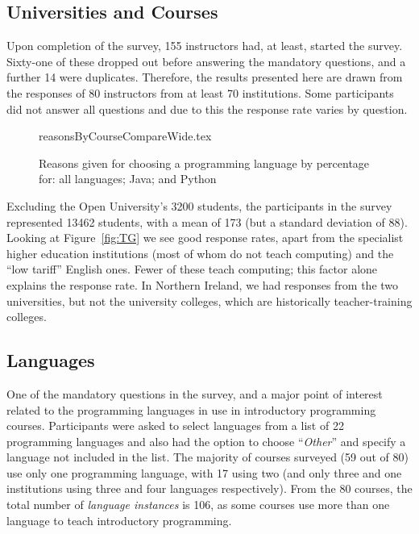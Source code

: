 \documentclass[english,submission]{programming}
\begin{document}
\subsection{Universities and Courses}

Upon completion of the survey, 155 instructors had, at least, started
the survey. Sixty-one of these dropped out before answering the
mandatory questions, and a further 14 were duplicates. Therefore, the
results presented here are drawn from the responses of 80 instructors
from at least 70 institutions. Some participants did not answer all
questions and due to this the response rate varies by question.

\begin{figure}
\begin{center}
{reasonsByCourseCompareWide.tex}
\end{center}
\caption{Reasons given for choosing a programming language by percentage for: all languages; Java; and Python\label{fig:reasons}}
\end{figure}

Excluding the Open University's 3200 students, the participants in the
survey represented 13462 students, with a mean of 173 (but a standard
deviation of 88). Looking at Figure~\ref{fig:TG} we see good response
rates, apart from the specialist higher education institutions (most
of whom do not teach computing) and the ``low tariff'' English
ones. Fewer of these teach computing; this factor alone explains the
response rate. In Northern Ireland, we had responses from the two
universities, but not the university colleges, which are historically
teacher-training colleges.


\subsection{Languages}\label{langs}


One of the mandatory questions in the survey, and a major point of
interest related to the programming languages in use in introductory
programming courses. Participants were asked to select languages from
a list of 22 programming languages and also had the option to choose
``{\emph{Other}}'' and specify a language not included in the list. The
majority of courses surveyed (59 out of 80) use only one programming
language, with 17 using two (and only three and one institutions using
three and four languages respectively). From the 80 courses, the total
number of {\emph{language instances}} is 106, as some courses use more
than one language to teach introductory programming.
\end{document}
